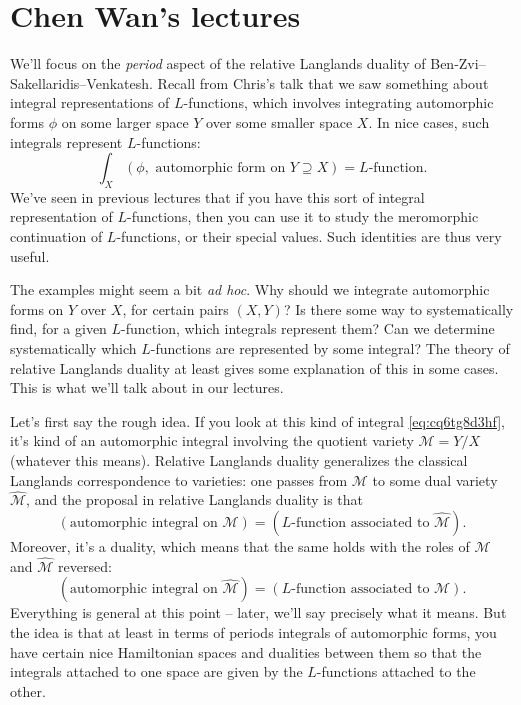 \documentclass[reqno]{amsart} 
\begin{document}
\section{Chen Wan's lectures}\label{sec:cq6tho3cpy}

We'll focus on the \emph{period} aspect of the relative Langlands duality of Ben-Zvi--Sakellaridis--Venkatesh.  Recall from Chris's talk that we saw something about integral representations of $L$-functions, which involves integrating automorphic forms $\phi$ on some larger space $Y$ over some smaller space $X$.  In nice cases, such integrals represent $L$-functions:
\begin{equation}\label{eq:cq6tg8d3hf}
  \int_X (\phi, \text{ automorphic form on $Y \supseteq X$}) = \text{$L$-function}.
\end{equation}
We've seen in previous lectures that if you have this sort of integral representation of $L$-functions, then you can use it to study the meromorphic continuation of $L$-functions, or their special values.  Such identities are thus very useful.

The examples might seem a bit \emph{ad hoc}.  Why should we integrate automorphic forms on $Y$ over $X$, for certain pairs $(X, Y)$?  Is there some way to systematically find, for a given $L$-function, which integrals represent them?  Can we determine systematically which $L$-functions are represented by some integral?  The theory of relative Langlands duality at least gives some explanation of this in some cases.  This is what we'll talk about in our lectures.

Let's first say the rough idea.  If you look at this kind of integral \eqref{eq:cq6tg8d3hf}, it's kind of an automorphic integral involving the quotient variety $\mathcal{M} = Y / X$ (whatever this means).  Relative Langlands duality generalizes the classical Langlands correspondence to varieties: one passes from $\mathcal{M}$ to some dual variety $\hat{\mathcal{M}}$, and the proposal in relative Langlands duality is that
\begin{equation*}
  (\text{automorphic integral on } \mathcal{M})
  = 
  (\text{$L$-function associated to } \hat{\mathcal{M}}).
\end{equation*}
Moreover, it's a duality, which means that the same holds with the roles of $\mathcal{M}$ and $\hat{\mathcal{M}}$ reversed:
\begin{equation*}
  (\text{automorphic integral on } \hat{\mathcal{M}})
  = 
  (\text{$L$-function associated to } \mathcal{M}).
\end{equation*}
Everything is general at this point -- later, we'll say precisely what it means.  But the idea is that at least in terms of periods integrals of automorphic forms, you have certain nice Hamiltonian spaces and dualities between them so that the integrals attached to one space are given by the $L$-functions attached to the other.
\end{document}
